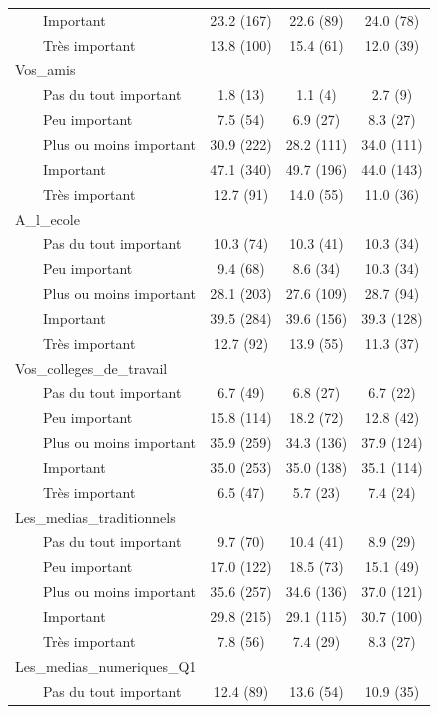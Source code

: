 \documentclass[
]{article}
\begin{document}
\begin{table}[!t]
\begin{tabular*}{\linewidth}{@{\extracolsep{\fill}}lccc}
    Important & 23.2 (167) & 22.6 (89) & 24.0 (78) \\ 
    Très important & 13.8 (100) & 15.4 (61) & 12.0 (39) \\ 
Vos\_amis &  &  &  \\ 
    Pas du tout important & 1.8 (13) & 1.1 (4) & 2.7 (9) \\ 
    Peu important & 7.5 (54) & 6.9 (27) & 8.3 (27) \\ 
    Plus ou moins important & 30.9 (222) & 28.2 (111) & 34.0 (111) \\ 
    Important & 47.1 (340) & 49.7 (196) & 44.0 (143) \\ 
    Très important & 12.7 (91) & 14.0 (55) & 11.0 (36) \\ 
A\_l\_ecole &  &  &  \\ 
    Pas du tout important & 10.3 (74) & 10.3 (41) & 10.3 (34) \\ 
    Peu important & 9.4 (68) & 8.6 (34) & 10.3 (34) \\ 
    Plus ou moins important & 28.1 (203) & 27.6 (109) & 28.7 (94) \\ 
    Important & 39.5 (284) & 39.6 (156) & 39.3 (128) \\ 
    Très important & 12.7 (92) & 13.9 (55) & 11.3 (37) \\ 
Vos\_colleges\_de\_travail &  &  &  \\ 
    Pas du tout important & 6.7 (49) & 6.8 (27) & 6.7 (22) \\ 
    Peu important & 15.8 (114) & 18.2 (72) & 12.8 (42) \\ 
    Plus ou moins important & 35.9 (259) & 34.3 (136) & 37.9 (124) \\ 
    Important & 35.0 (253) & 35.0 (138) & 35.1 (114) \\ 
    Très important & 6.5 (47) & 5.7 (23) & 7.4 (24) \\ 
Les\_medias\_traditionnels &  &  &  \\ 
    Pas du tout important & 9.7 (70) & 10.4 (41) & 8.9 (29) \\ 
    Peu important & 17.0 (122) & 18.5 (73) & 15.1 (49) \\ 
    Plus ou moins important & 35.6 (257) & 34.6 (136) & 37.0 (121) \\ 
    Important & 29.8 (215) & 29.1 (115) & 30.7 (100) \\ 
    Très important & 7.8 (56) & 7.4 (29) & 8.3 (27) \\ 
Les\_medias\_numeriques\_Q1 &  &  &  \\ 
    Pas du tout important & 12.4 (89) & 13.6 (54) & 10.9 (35) \\ 

\end{tabular*}
\end{table}
\end{document}
